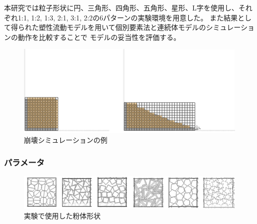 \documentclass[12pt]{ltjsarticle}
\begin{document}
本研究では粒子形状に円、三角形、四角形、五角形、星形、L字を使用し、それぞれ1:1, 1:2, 1:3, 2:1, 3:1, 2:2の6パターンの実験環境を用意した。
また結果として得られた塑性流動モデルを用いて個別要素法と連続体モデルのシミュレーションの動作を比較することで
モデルの妥当性を評価する。
\begin{figure}[htbp]
\centering
  \includegraphics*[scale=0.4]{nagasu_kousi.png}
\caption{崩壊シミュレーションの例}
\end{figure}

\clearpage

\subsubsection{パラメータ}
\begin{figure}[htbp]
  \centering
  \includegraphics*[scale=0.5]{keijou.png}
\caption{実験で使用した粉体形状}
\end{figure}
\end{document}
